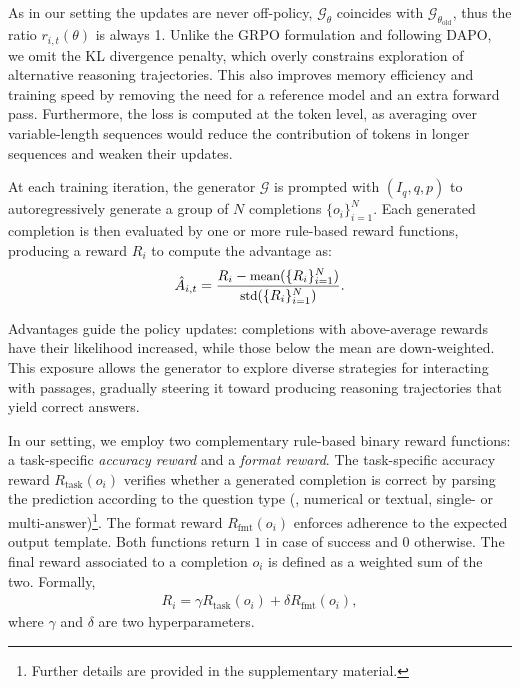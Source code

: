 As in our setting the updates are never off-policy, $\mathcal{G}_{\theta}$ coincides with $\mathcal{G}_{\theta_{\text{old}}}$, thus the ratio $r_{i,t}(\theta)$ is always 1.
Unlike the GRPO formulation and following DAPO, we omit the KL divergence penalty, which overly constrains exploration of alternative reasoning trajectories. This also improves memory efficiency and training speed by removing the need for a reference model and an extra forward pass. Furthermore, the loss is computed at the token level, as averaging over variable-length sequences would reduce the contribution of tokens in longer sequences and weaken their updates.

At each training iteration, the generator $\mathcal{G}$ is prompted with $({I_q}, q, p)$ to autoregressively generate a group of $N$ completions $\{{o_i}\}_{i=1}^N$. Each generated completion is then evaluated by one or more rule-based reward functions, producing a reward $R_i$ to compute the advantage as:
\begin{equation}
\small
   \hat{A}_{i,t} = \frac{R_i - \text{mean}(\{R_i\}_{i=1}^N)}{\text{std}(\{R_i\}_{i=1}^N)}.
\label{eq:advantage_calculation}
\end{equation}

Advantages guide the policy updates: completions with above-average rewards have their likelihood increased, while those below the mean are down-weighted. This exposure allows the generator to explore diverse strategies for interacting with passages, gradually steering it toward producing reasoning trajectories that yield correct answers.

In our setting, we employ two complementary rule-based binary reward functions: a task-specific \textit{accuracy reward} and a \textit{format reward}. The task-specific accuracy reward $R_{\text{task}}(o_i)$ verifies whether a generated completion is correct by parsing the prediction according to the question type (\ie, numerical or textual, single- or multi-answer)\footnote{Further details are provided in the supplementary material.}.  The format reward $R_{\text{fmt}}(o_i)$ enforces adherence to the expected output template. Both functions return $1$ in case of success and $0$ otherwise.
The final reward associated to a completion $o_i$ is defined as a weighted sum of the two. Formally, 
\begin{equation}
\begin{aligned}
R_i = \gamma R_{\text{task}}(o_i) + \delta R_{\text{fmt}}(o_i),
\end{aligned}
\label{eq:total_reward}
\end{equation}
where $\gamma$ and $\delta$ are two hyperparameters.
